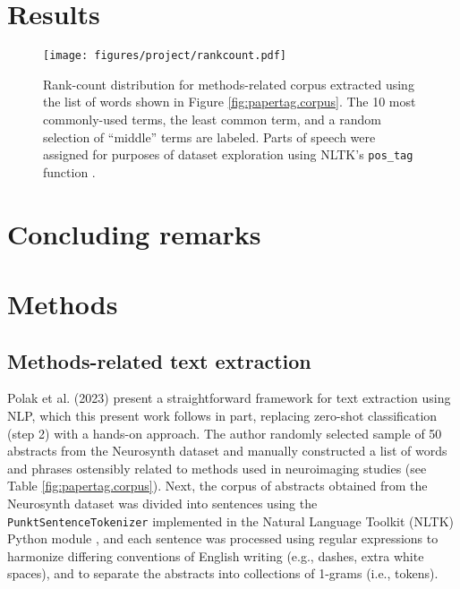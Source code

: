 \section{Results}
\label{sec:papertag.results}


\begin{figure*}[]
	\centering	
	\texttt{[image: figures/project/rankcount.pdf]}  
	\caption{Rank-count distribution for methods-related corpus extracted using the list of words shown in Figure \ref{fig:papertag.corpus}. The 10 most commonly-used terms, the least common term, and a random selection of ``middle'' terms are labeled. Parts of speech were assigned for purposes of dataset exploration using NLTK's \texttt{pos\_tag} function \cite{BirdEtAl2009}.}
	\label{fig:papertag.rankcount}
\end{figure*}


\section{Concluding remarks}
\label{sec:papertag.concludingremarks}




\section{Methods}
\label{sec:papertag.methods}

\subsection{Methods-related text extraction}

Polak et al. (2023) \cite{PolakEtAl2023} present a straightforward framework for text extraction using NLP, which this present work follows in part, replacing zero-shot classification (step 2) with a hands-on approach. The author randomly selected sample of 50 abstracts from the Neurosynth dataset and manually constructed a list of words and phrases ostensibly related to methods used in neuroimaging studies (see Table \ref{fig:papertag.corpus}). Next, the corpus of abstracts obtained from the Neurosynth dataset was divided into sentences using the \texttt{PunktSentenceTokenizer} \cite{KissStrunk2006} implemented in the Natural Language Toolkit (NLTK) Python module \cite{BirdEtAl2009}, and each sentence was processed using regular expressions to harmonize differing conventions of English writing (e.g., dashes, extra white spaces), and to separate the abstracts into collections of 1-grams (i.e., tokens). 

